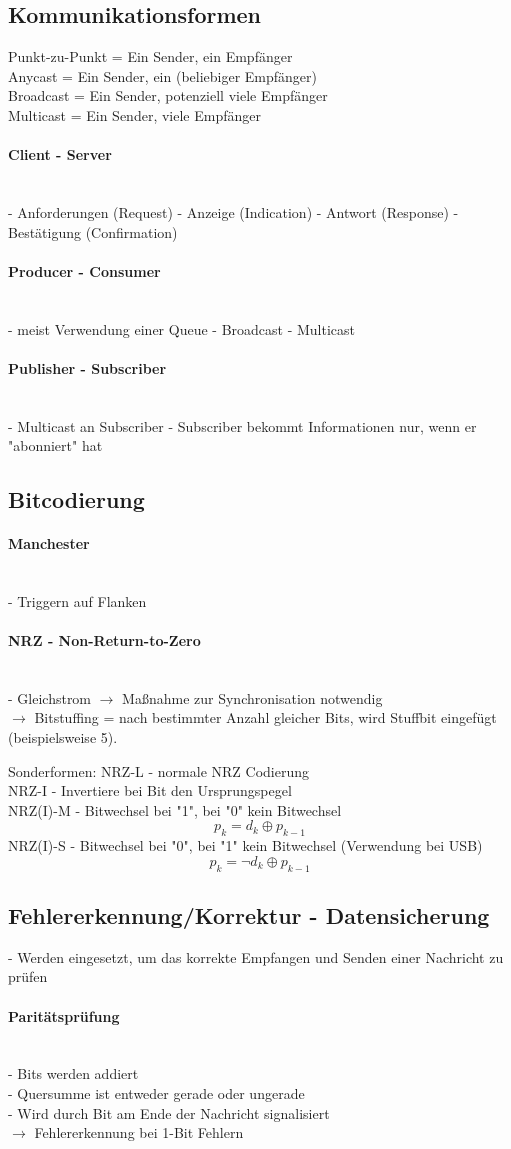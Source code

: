 \documentclass{article}
\newcommand{\myparagraph}[1]{\paragraph{#1}\mbox{}\\}
\newcommand{\follows}{$\rightarrow$ }
\newcommand*\xor{\mathbin{\oplus}}
\begin{document}
	\subsection{Kommunikationsformen}
	Punkt-zu-Punkt = Ein Sender, ein Empfänger \\
	Anycast = Ein Sender, ein (beliebiger Empfänger) \\
	Broadcast = Ein Sender, potenziell viele Empfänger \\
	Multicast = Ein Sender, viele Empfänger
	
	\myparagraph{Client - Server}
	- Anforderungen (Request)
	- Anzeige (Indication)
	- Antwort (Response)
	- Bestätigung (Confirmation)
	
	\myparagraph{Producer - Consumer}
	- meist Verwendung einer Queue
	- Broadcast
	- Multicast
	
	\myparagraph{Publisher - Subscriber}
	- Multicast an Subscriber
	- Subscriber bekommt Informationen nur, wenn er "abonniert" hat
	
	\subsection{Bitcodierung}
	\myparagraph{Manchester}
	- Triggern auf Flanken
	
	\myparagraph{NRZ - Non-Return-to-Zero}
	- Gleichstrom \follows Maßnahme zur Synchronisation notwendig \\
	\follows Bitstuffing = nach bestimmter Anzahl gleicher Bits, wird Stuffbit eingefügt (beispielsweise 5).
	
	Sonderformen:
	NRZ-L - normale NRZ Codierung \\
	NRZ-I - Invertiere bei Bit den Ursprungspegel \\
	NRZ(I)-M - Bitwechsel bei "1", bei "0" kein Bitwechsel
	$$ p_{k} = d_{k} \xor p_{k-1} $$
	NRZ(I)-S - Bitwechsel bei "0", bei "1" kein Bitwechsel (Verwendung bei USB)
	$$ p_{k} = \neg d_{k} \xor p_{k-1} $$
	
	\subsection{Fehlererkennung/Korrektur - Datensicherung}
	- Werden eingesetzt, um das korrekte Empfangen und Senden einer Nachricht zu prüfen

	\myparagraph{Paritätsprüfung}
	- Bits werden addiert \\
	- Quersumme ist entweder gerade oder ungerade \\
	- Wird durch Bit am Ende der Nachricht signalisiert \\
	\follows Fehlererkennung bei 1-Bit Fehlern
	
\end{document}
